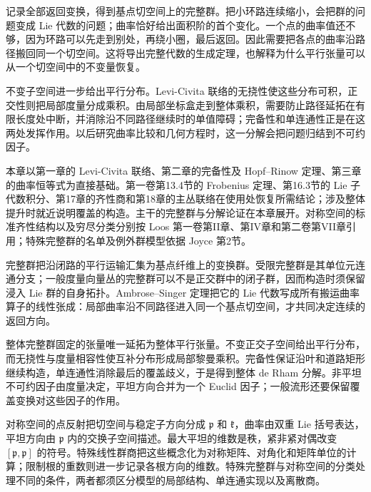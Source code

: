 \ProseParagraphBreak

记录全部返回变换，得到基点切空间上的完整群。把小环路连续缩小，会把群的问题变成 Lie 代数的问题；曲率恰好给出面积阶的首个变化。一个点的曲率值还不够，因为环路可以先走到别处，再绕小圈，最后返回。因此需要把各点的曲率沿路径搬回同一个切空间。这将导出完整代数的生成定理，也解释为什么平行张量可以从一个切空间中的不变量恢复。

\ProseParagraphBreak

不变子空间进一步给出平行分布。Levi-Civita 联络的无挠性使这些分布可积，正交性则把局部度量分成乘积。由局部坐标盒走到整体乘积，需要防止路径延拓在有限长度处中断，并消除沿不同路径继续时的单值障碍；完备性和单连通性正是在这两处发挥作用。以后研究曲率比较和几何方程时，这一分解会把问题归结到不可约因子。

\ProseParagraphBreak

本章以第一章的 Levi-Civita 联络、第二章的完备性及 Hopf--Rinow 定理、第三章的曲率恒等式为直接基础。第一卷第13.4节的 Frobenius 定理、第16.3节的 Lie 子代数积分、第17章的齐性商和第18章的主丛联络在使用处恢复所需结论；涉及整体提升时就近说明覆盖的构造。主干的完整群与分解论证在本章展开。对称空间的标准齐性结构以及穷尽分类分别按 Loos 第一卷第II章、第IV章和第二卷第VII章引用\cite[第II章，第1--2节；第IV章，第1节]{Loos1969SymmetricI}\cite[第VII章，第2--3节]{Loos1969SymmetricII}；特殊完整群的名单及例外群模型依据 Joyce 第2节\cite[第2.1--2.5节，第111--115页]{Joyce2006ExceptionalHolonomy}。








\begin{chaptersummary}
	完整群把沿闭路的平行运输汇集为基点纤维上的变换群。受限完整群是其单位元连通分支；一般度量向量丛的完整群可以不是正交群中的闭子群，因而构造时须保留浸入 Lie 群的自身拓扑。Ambrose--Singer 定理把它的 Lie 代数写成所有搬运曲率算子的线性张成：局部曲率沿不同路径进入同一个基点切空间，才共同决定连续的返回方向。

	\ProseParagraphBreak

	整体完整群固定的张量唯一延拓为整体平行张量。不变正交子空间给出平行分布，而无挠性与度量相容性使互补分布形成局部黎曼乘积。完备性保证沿叶和道路矩形继续构造，单连通性消除最后的覆盖歧义，于是得到整体 de Rham 分解。非平坦不可约因子由度量决定，平坦方向合并为一个 Euclid 因子；一般流形还要保留覆盖变换对这些因子的作用。

	\ProseParagraphBreak

	对称空间的点反射把切空间与稳定子方向分成 \(\mathfrak p\) 和 \(\mathfrak k\)，曲率由双重 Lie 括号表达，平坦方向由 \(\mathfrak p\) 内的交换子空间描述。最大平坦的维数是秩，紧非紧对偶改变 \([\mathfrak p,\mathfrak p]\) 的符号。特殊线性群商把这些概念化为对称矩阵、对角化和矩阵单位的计算；限制根的重数则进一步记录各根方向的维数。特殊完整群与对称空间的分类处理不同的条件，两者都须区分模型的局部结构、单连通实现以及离散商。
\end{chaptersummary}

